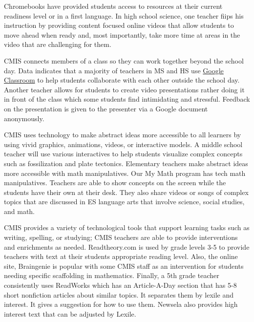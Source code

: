 \begin{findings}

Chromebooks have provided students access to resources at their current readiness level or in a first language. In high school science, one teacher fiips his instruction by providing content focused online videos that allow students to move ahead when ready and, most importantly, take more time at areas in the video that are challenging for them.  

CMIS connects members of a class so they can work together beyond the school day. Data indicates that a majority of teachers in MS and HS use \href{https://classroom.google.com/u/0/h}{Google Classroom} to help students collaborate with each other outside the school day. Another teacher allows for students to create video presentations rather doing it in front of the class  which some students find intimidating and stressful. Feedback on the presentation is given to the presenter via a Google document anonymously.  

CMIS uses technology to make abstract ideas more accessible to all learners by using vivid graphics, animations, videos, or interactive models. A middle school teacher will use various interactives to help students visualize complex concepts such as fossilization and plate tectonics. Elementary teachers make abstract ideas more accessible with math manipulatives. Our My Math program has tech math manipulatives. Teachers are able to show concepts on the screen while the students  have their own at their desk. They also share videos or songs of complex topics that are discussed in ES language arts that involve science, social studies, and math. 

CMIS provides a variety of technological  tools that support learning tasks such as writing, spelling, or studying; CMIS teachers are able to provide interventions and enrichments as needed. Readtheory.com is used by grade levels 3-5 to provide teachers with text at their students appropriate reading level. Also, the online site, Braingenie is popular with some CMIS staff as an intervention for students needing specific scaffolding in mathematics. Finally, a 5th grade teacher consistently uses ReadWorks which has an Article-A-Day section that has 5-8 short nonfiction articles about similar topics. It separates them by lexile and interest. It gives a suggestion for how to use them. Newsela also provides high interest text that can be adjusted by Lexile. 

 

\end{findings}
